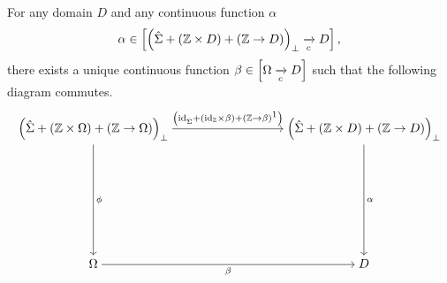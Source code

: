 \begin{enumcirc}
\begin{enumrm}
		For any domain $D$ and any continuous function $\alpha$
		\[
			\alpha \in \left[ \left( \hat{\Sigma} + \left( \mathbb{Z} \times D \right) + \left( \mathbb{Z} \to D \right) \right)_\bot \xrightarrow[c]{} D \right],
		\]
		there exists a unique continuous function $\beta \in \left[ \Omega \xrightarrow[c]{} D \right]$
		such that the following diagram commutes.
		\[
			\begin{tikzcd}[cramped, sep=9em]
				\prths{\hat{\Sigma} + \prths{\Z \times \Omega} + \prths{\Z \to \Omega}}_\bot
				\arrow[r, "\prths{\textrm{id}_{\hat{\Sigma}}+\prths{\textrm{id}_\Z\times\beta}+\prths{\Z\to\beta}\footnotemark}"]
				\arrow[d, "\phi"] &
				\prths{\hat{\Sigma} + \prths{\Z \times D} + \prths{\Z \to D}}_\bot \arrow[d, "\alpha"]\\
				\Omega \arrow[r, "\beta"']                                                                                         & D
			\end{tikzcd}
		\]


\end{enumrm}
\end{enumcirc}
